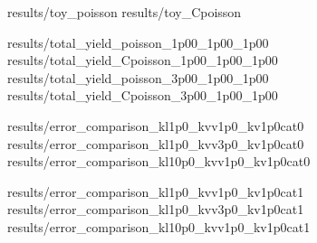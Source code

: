 {results/toy_poisson}
{results/toy_Cpoisson}

{results/total_yield_poisson_1p00_1p00_1p00}
{results/total_yield_Cpoisson_1p00_1p00_1p00}
{results/total_yield_poisson_3p00_1p00_1p00}
{results/total_yield_Cpoisson_3p00_1p00_1p00}

{results/error_comparison_kl1p0_kvv1p0_kv1p0cat0}
{results/error_comparison_kl1p0_kvv3p0_kv1p0cat0}
{results/error_comparison_kl10p0_kvv1p0_kv1p0cat0}

{results/error_comparison_kl1p0_kvv1p0_kv1p0cat1}
{results/error_comparison_kl1p0_kvv3p0_kv1p0cat1}
{results/error_comparison_kl10p0_kvv1p0_kv1p0cat1}


